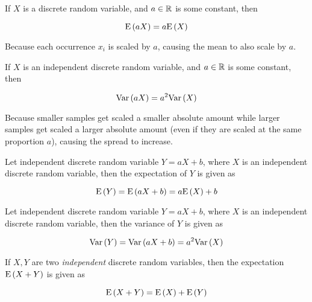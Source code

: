 \begin{definition}
    If $X$ is a discrete random variable, and $a \in \mathbb{R}$ is some constant, then
    
    \begin{equation}
        \mathrm{E} \left( aX \right) = a\mathrm{E} \left( X \right)
    \end{equation}
    
    Because each occurrence $x_i$ is scaled by $a$, causing the mean to also scale by $a$.
\end{definition}

\begin{definition}
    If $X$ is an independent discrete random variable, and $a \in \mathbb{R}$ is some constant, then
    
    \begin{equation}
        \mathrm{Var} \left( aX \right) = a^2 \mathrm{Var} \left( X \right)
    \end{equation}
    
    Because smaller samples get scaled a smaller absolute amount while larger samples get scaled a larger absolute amount (even if they are scaled at the same proportion $a$), causing the spread to increase.
\end{definition}

\begin{definition}
    Let independent discrete random variable $Y = aX + b$, where $X$ is an independent discrete random variable, then the expectation of $Y$ is given as
    
    \begin{equation}
        \mathrm{E} \left( Y \right) = \mathrm{E} \left( aX + b \right) = a\mathrm{E} \left( X \right) + b
    \end{equation}
\end{definition}

\begin{definition}
    Let independent discrete random variable $Y = aX + b$, where $X$ is an independent discrete random variable, then the variance of $Y$ is given as
    
    \begin{equation}
        \mathrm{Var} \left( Y \right) = \mathrm{Var} \left( aX + b \right) = a^2 \mathrm{Var} \left( X \right)
    \end{equation}
\end{definition}

\begin{definition}
    If $X, Y$ are two \textit{independent} discrete random variables, then the expectation $\mathrm{E} \left( X + Y \right)$ is given as
    
    \begin{equation}
        \mathrm{E} \left( X + Y \right) = \mathrm{E} \left( X \right) + \mathrm{E} \left( Y \right)
    \end{equation}
\end{definition}

